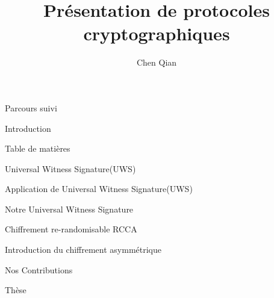 \documentclass{beamer}
\title{Pr\'esentation de protocoles cryptographiques}
\author{Chen Qian}
\institute{\'ENS de Rennes, France}
\begin{document}

\begin{frame}
  \maketitle
\end{frame}

\begin{section}{Parcours suivi}
  
\end{section}

\begin{section}{Introduction}
  
\end{section}

\begin{frame}{Table de mati\`eres}
  \tableofcontents
\end{frame}


\begin{section}{Universal Witness Signature(UWS)}
  
  \begin{subsection}{Application de Universal Witness Signature(UWS)}
    
  \end{subsection}

  \begin{subsection}{Notre Universal Witness Signature}
    
  \end{subsection}

\end{section}

\begin{section}{Chiffrement re-randomisable RCCA}

  \begin{subsection}{Introduction du chiffrement asymm\'etrique}
    
  \end{subsection}
  
  \begin{subsection}{Nos Contributions}
    
  \end{subsection}

\end{section}


\begin{section}{Th\`ese}
  
\end{section}


%    
\end{document}

